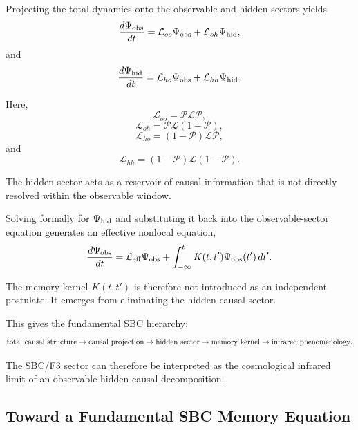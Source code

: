 Projecting the total dynamics onto the observable and hidden sectors yields
\begin{equation}
\frac{d\Psi_{\rm obs}}{dt}
=
\mathcal L_{oo}\Psi_{\rm obs}
+
\mathcal L_{oh}\Psi_{\rm hid},
\end{equation}
and
\begin{equation}
\frac{d\Psi_{\rm hid}}{dt}
=
\mathcal L_{ho}\Psi_{\rm obs}
+
\mathcal L_{hh}\Psi_{\rm hid}.
\end{equation}

Here,
\begin{equation}
\mathcal L_{oo}
=
\mathcal P\mathcal L\mathcal P,
\end{equation}
\begin{equation}
\mathcal L_{oh}
=
\mathcal P\mathcal L(1-\mathcal P),
\end{equation}
\begin{equation}
\mathcal L_{ho}
=
(1-\mathcal P)\mathcal L\mathcal P,
\end{equation}
and
\begin{equation}
\mathcal L_{hh}
=
(1-\mathcal P)\mathcal L(1-\mathcal P).
\end{equation}

The hidden sector acts as a reservoir of causal information that is not directly resolved within the observable window.

Solving formally for \(\Psi_{\rm hid}\) and substituting it back into the observable-sector equation generates an effective nonlocal equation,
\begin{equation}
\frac{d\Psi_{\rm obs}}{dt}
=
\mathcal L_{\rm eff}\Psi_{\rm obs}
+
\int_{-\infty}^{t}
K(t,t')
\Psi_{\rm obs}(t')
\,dt'.
\end{equation}

The memory kernel \(K(t,t')\) is therefore not introduced as an independent postulate. It emerges from eliminating the hidden causal sector.

This gives the fundamental SBC hierarchy:
\begin{equation}
{\rm total\ causal\ structure}
\rightarrow
{\rm causal\ projection}
\rightarrow
{\rm hidden\ sector}
\rightarrow
{\rm memory\ kernel}
\rightarrow
{\rm infrared\ phenomenology}.
\end{equation}

The SBC/F3 sector can therefore be interpreted as the cosmological infrared limit of an observable-hidden causal decomposition.

\subsection{Toward a Fundamental SBC Memory Equation}

